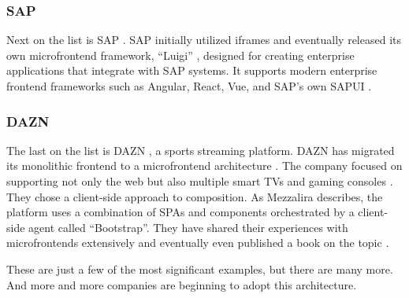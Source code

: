 \subsubsection*{SAP}
Next on the list is SAP \cite{SAP}. SAP initially utilized iframes and eventually released its own microfrontend framework, ``Luigi'' \cite{Luigi}, designed for creating enterprise applications that integrate with SAP systems. It supports modern enterprise frontend frameworks such as Angular, React, Vue, and SAP's own SAPUI \cite{MezzaliraBuildingMf}.

\subsubsection*{DAZN}
The last on the list is DAZN \cite{DAZN}, a sports streaming platform. DAZN has migrated its monolithic frontend to a microfrontend architecture \cite{Geers}. The company focused on supporting not only the web but also multiple smart TVs and gaming consoles \cite{MezzaliraBuildingMf}. They chose a client-side approach to composition. As Mezzalira \cite{MezzaliraBuildingMf} describes, the platform uses a combination of SPAs and components orchestrated by a client-side agent called ``Bootstrap''. They have shared their experiences with microfrontends extensively and eventually even published a book on the topic \cite{MezzaliraBuildingMf}.

\noindent
These are just a few of the most significant examples, but there are many more. And more and more companies are beginning to adopt this architecture.